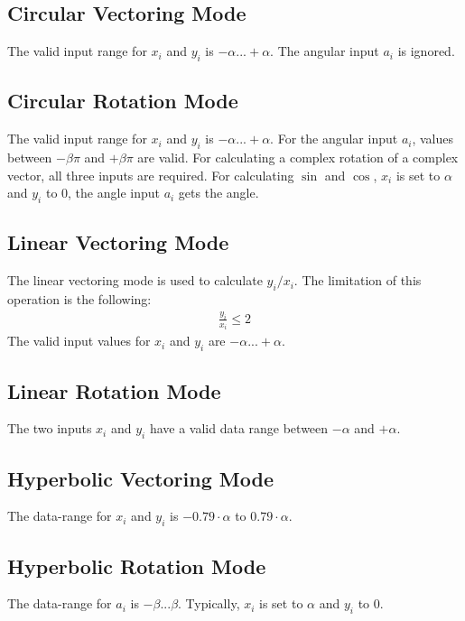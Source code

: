 \documentclass[a4paper, 12pt, notitlepage]{report}
\begin{document}
   \subsection{Circular Vectoring Mode}

      The valid input range for $x_i$ and $y_i$ is $-\alpha ... +\alpha$.
      The angular input $a_i$ is ignored.

   \subsection{Circular Rotation Mode}
      The valid input range for $x_i$ and $y_i$ is $-\alpha ... +\alpha$.
      For the angular input $a_i$, values between $-\beta\pi$ and $+\beta\pi$ are valid.
      For calculating a complex rotation of a complex vector, all three inputs
      are required. For calculating $\sin$ and $\cos$, $x_i$ is set to $\alpha$
      and $y_i$ to 0, the angle input $a_i$ gets the angle.

   \subsection{Linear Vectoring Mode}
      The linear vectoring mode is used to calculate $y_i / x_i$. The limitation
      of this operation is the following:
      \begin{eqnarray}
         \frac{y_i}{x_i} \le 2
      \end{eqnarray}
      The valid input values for $x_i$ and $y_i$ are $-\alpha ... +\alpha$.

   \subsection{Linear Rotation Mode}
      The two inputs $x_i$ and $y_i$ have a valid data range between $-\alpha$ and $+\alpha$.


   \subsection{Hyperbolic Vectoring Mode}
      The data-range for $x_i$ and $y_i$ is $-0.79 \cdot \alpha$ to $0.79 \cdot \alpha$.


   \subsection{Hyperbolic Rotation Mode}
      The data-range for $a_i$ is $-\beta ... \beta$. Typically, $x_i$ is set to 
      $\alpha$ and $y_i$ to 0.
\end{document}
